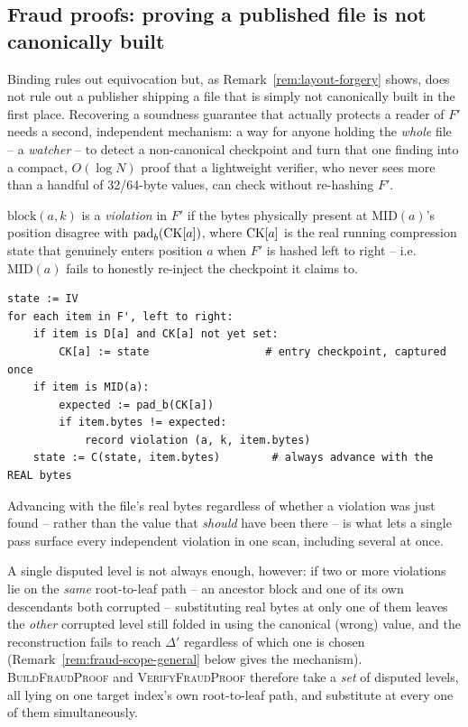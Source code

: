 \subsection{Fraud proofs: proving a published file is not canonically built}
\label{sec:fraud-proofs}

Binding rules out equivocation but, as Remark~\ref{rem:layout-forgery}
shows, does not rule out a publisher shipping a file that is simply not
canonically built in the first place. Recovering a soundness guarantee
that actually protects a reader of $F'$ needs a second, independent
mechanism: a way for anyone holding the \emph{whole} file -- a
\emph{watcher} -- to detect a non-canonical checkpoint and turn that one
finding into a compact, $O(\log N)$ proof that a lightweight verifier, who
never sees more than a handful of 32/64-byte values, can check without
re-hashing $F'$.

\begin{definition}[Violation]
$\mathrm{block}(a,k)$ is a \emph{violation} in $F'$ if the bytes physically
present at $\mathrm{MID}(a)$'s position disagree with
$\mathrm{pad}_b(\mathrm{CK}[a])$, where $\mathrm{CK}[a]$ is the real running compression
state that genuinely enters position $a$ when $F'$ is hashed left to
right -- i.e.\ $\mathrm{MID}(a)$ fails to honestly re-inject the checkpoint
it claims to.
\end{definition}

\begin{algorithm}[H]
\caption{$\textsc{ScanForViolations}(F')$ -- watcher, $O(N)$, one linear pass}
\label{alg:scan}
\begin{lstlisting}[style=pseudo]
state := IV
for each item in F', left to right:
    if item is D[a] and CK[a] not yet set:
        CK[a] := state                  # entry checkpoint, captured once
    if item is MID(a):
        expected := pad_b(CK[a])
        if item.bytes != expected:
            record violation (a, k, item.bytes)
    state := C(state, item.bytes)        # always advance with the REAL bytes
\end{lstlisting}
\end{algorithm}

Advancing with the file's real bytes regardless of whether a violation was
just found -- rather than the value that \emph{should} have been there --
is what lets a single pass surface every independent violation in one
scan, including several at once.

A single disputed level is not always enough, however: if two or more
violations lie on the \emph{same} root-to-leaf path -- an ancestor block
and one of its own descendants both corrupted -- substituting real bytes
at only one of them leaves the \emph{other} corrupted level still folded
in using the canonical (wrong) value, and the reconstruction fails to
reach $\Delta'$ regardless of which one is chosen (Remark~\ref{rem:fraud-scope-general}
below gives the mechanism). \textsc{BuildFraudProof} and
\textsc{VerifyFraudProof} therefore take a \emph{set} of disputed levels,
all lying on one target index's own root-to-leaf path, and substitute at
every one of them simultaneously.

